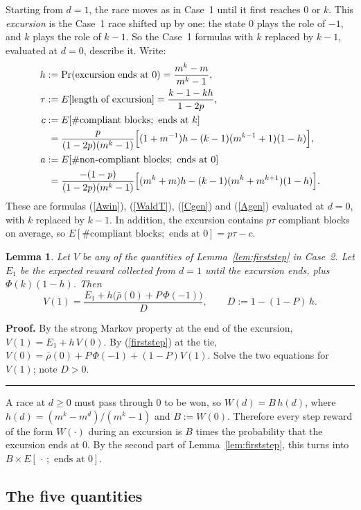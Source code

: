\documentclass{article}%
\newtheorem{lemma}[theorem]{Lemma}
\newenvironment{proof}[1][Proof]{\noindent\textbf{#1.} }{\ \rule{0.5em}{0.5em}}
\begin{document}
Starting from $d=1$, the race moves as in Case~1 until it first reaches $0$ or
$k$. This \emph{excursion} is the Case~1 race shifted up by one: the state $0$
plays the role of $-1$, and $k$ plays the role of $k-1$. So the Case~1
formulas with $k$ replaced by $k-1$, evaluated at $d=0$, describe it. Write:%
\begin{align*}
h  &  :=\Pr(\text{excursion ends at }0)=\frac{m^{k}-m}{m^{k}-1},\\
\tau &  :=E[\text{length of excursion}]=\frac{k-1-kh}{1-2p},\\
c  &  :=E[\#\text{compliant blocks};\text{ ends at }k]\\
&  \phantom{:}=\frac{p}{(1-2p)(m^{k}-1)}\Bigl[(1+m^{-1})h-(k-1)(m^{k-1}%
+1)(1-h)\Bigr],\\
a  &  :=E[\#\text{non-compliant blocks};\text{ ends at }0]\\
&  \phantom{:}=\frac{-(1-p)}{(1-2p)(m^{k}-1)}\Bigl[(m^{k}+m)h-(k-1)(m^{k}%
+m^{k+1})(1-h)\Bigr].
\end{align*}
These are formulas (\ref{Awin}), (\ref{WaldT}), (\ref{Cgen}) and (\ref{Agen})
evaluated at $d=0$, with $k$ replaced by $k-1$. In addition, the excursion contains $p\tau$ compliant blocks
on average, so $E[\#\text{compliant blocks};\text{ ends at }0]=p\tau-c$.

\begin{lemma}
\label{lem:renewal}Let $V$ be any of the quantities of
Lemma~\ref{lem:firststep} in Case~2. Let $E_{1}$ be the expected reward
collected from $d=1$ until the excursion ends, plus $\Phi(k)(1-h)$. Then%
\[
V(1)=\frac{E_{1}+h\bigl(\bar{\rho}(0)+P\,\Phi(-1)\bigr)}{D},\qquad
D:=1-(1-P)\,h.
\]
\end{lemma}

\begin{proof}
By the strong Markov property at the end of the excursion, $V(1)=E_{1}%
+h\,V(0)$. By (\ref{firststep}) at the tie, $V(0)=\bar{\rho}(0)+P\,\Phi
(-1)+(1-P)V(1)$. Solve the two equations for $V(1)$; note $D>0$.
\end{proof}

A race at $d\geq0$ must pass through $0$ to be won, so $W(d)=B\,h(d)$, where
$h(d)=(m^{k}-m^{d})/(m^{k}-1)$ and $B:=W(0)$. Therefore every step reward of
the form $W(\cdot)$ during an excursion is $B$ times the probability that the
excursion ends at $0$. By the second part of Lemma~\ref{lem:firststep}, this
turns into $B\times E[\,\cdot\,;\text{ ends at }0]$.

\subsection{The five quantities}
\end{document}
